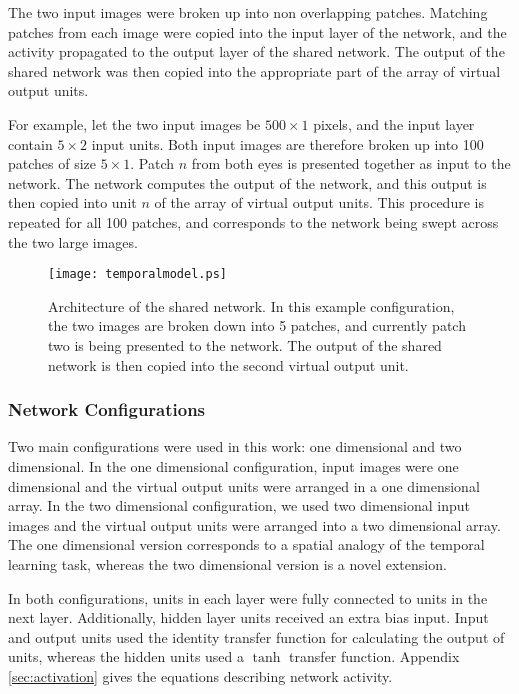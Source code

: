 \documentclass[a4paper]{article}
\begin{document}
The two input images were broken up into non overlapping patches.
Matching patches from each image were copied into the input layer of
the network, and the activity propagated to the output layer of the
shared network.  The output of the shared network was then copied into
the appropriate part of the array of virtual output units.

For example, let the two input images be $500 \times 1$ pixels, and
the input layer contain $5 \times 2$ input units.  Both input images
are therefore broken up into 100 patches of size $5 \times 1$.  Patch
$n$ from both eyes is presented together as input to the network.  The
network computes the output of the network, and this output is then
copied into unit $n$ of the array of virtual output units.  This
procedure is repeated for all 100 patches, and corresponds to the
network being swept across the two large images.

\begin{figure}[htbp]
  \begin{center}
    \leavevmode
    \texttt{[image: temporalmodel.ps]}
    \caption{Architecture of the shared network.  In this example
      configuration, the two images are broken down into 5 patches,
      and currently patch two is being presented to the network.
      The output of the shared network is then copied into the second
      virtual output unit.}
    \label{fig:temporalmodel}
  \end{center}
\end{figure}

\subsubsection{Network Configurations}

Two main configurations were used in this work: one dimensional and
two dimensional.  In the one dimensional configuration, input images
were one dimensional and the virtual output units were arranged in a
one dimensional array.  In the two dimensional configuration, we used
two dimensional input images and the virtual output units were
arranged into a two dimensional array.  The one dimensional version
corresponds to a spatial analogy of the temporal learning task,
whereas the two dimensional version is a novel extension.


In both configurations, units in each layer were fully connected to
units in the next layer.  Additionally, hidden layer units received an
extra bias input.  Input and output units used the identity transfer
function for calculating the output of units, whereas the hidden units
used a $\tanh$ transfer function.  Appendix \ref{sec:activation} gives
the equations describing network activity.
\end{document}
